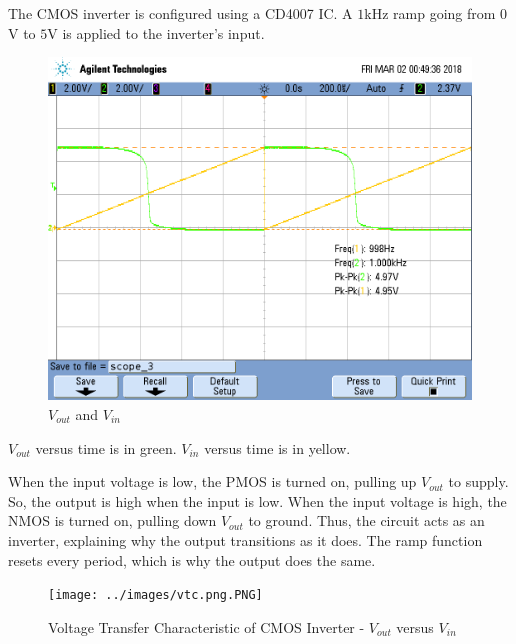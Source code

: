 The CMOS inverter is configured using a CD4007 IC.
A $1$\si{\kilo\hertz} ramp going from $0$\si{\volt} to $5$\si{\volt} is applied to the inverter's input.

\FloatBarrier

\begin{figure}[h!]
	\centering
	\includegraphics[scale=0.75]{../images/vout_and_vin_inverter_alt.PNG}
	\caption{$V_{out}$ and $V_{in}$}
	\label{fig:vout_and_vin_inverter_alt}
\end{figure}

\FloatBarrier

{\footnotesize $V_{out}$ versus time is in green. $V_{in}$ versus time is in yellow.}

\FloatBarrier

When the input voltage is low, the PMOS is turned on, pulling up $V_{out}$ to supply.
So, the output is high when the input is low.
When the input voltage is high, the NMOS is turned on, pulling down $V_{out}$ to ground.
Thus, the circuit acts as an inverter, explaining why the output transitions as it does.
The ramp function resets every period, which is why the output does the same.

\FloatBarrier

\begin{figure}[h!]
	\centering
	\texttt{[image: ../images/vtc.png.PNG]}
	\caption{Voltage Transfer Characteristic of CMOS Inverter - $V_{out}$ versus $V_{in}$}
	\label{fig:vtc.png}
\end{figure}

\FloatBarrier

